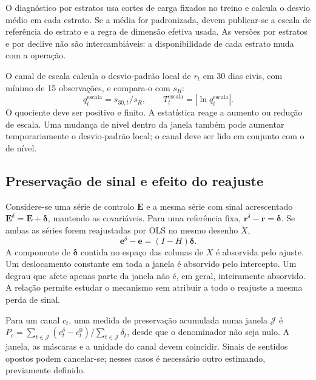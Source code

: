 O diagnóstico por estratos usa cortes de carga fixados no treino e calcula o desvio médio em cada estrato. Se a média for padronizada, devem publicar-se a escala de referência do estrato e a regra de dimensão efetiva usada. As versões por estratos e por declive não são intercambiáveis: a disponibilidade de cada estrato muda com a operação.

O canal de escala calcula o desvio-padrão local de $r_t$ em 30 dias civis, com mínimo de 15 observações, e compara-o com $s_R$:
\begin{equation}
q_t^{\mathrm{escala}}=s_{30,t}/s_R,
\qquad T_t^{\mathrm{escala}}=|\ln q_t^{\mathrm{escala}}|.
\label{eq:mat-monitor-escala}
\end{equation}
O quociente deve ser positivo e finito. A estatística reage a aumento ou redução de escala. Uma mudança de nível dentro da janela também pode aumentar temporariamente o desvio-padrão local; o canal deve ser lido em conjunto com o de nível.

\subsection{Preservação de sinal e efeito do reajuste}
\label{sec:mat-preservacao}
Considere-se uma série de controlo $\boldsymbol E$ e a mesma série com sinal acrescentado $\boldsymbol E^\delta=\boldsymbol E+\boldsymbol\delta$, mantendo as covariáveis. Para uma referência fixa, $\boldsymbol r^\delta-\boldsymbol r=\boldsymbol\delta$. Se ambas as séries forem reajustadas por OLS no mesmo desenho $X$,
\begin{equation}
\boldsymbol e^\delta-\boldsymbol e=(I-H)\boldsymbol\delta.
\label{eq:mat-projecao-sinal}
\end{equation}
A componente de $\boldsymbol\delta$ contida no espaço das colunas de $X$ é absorvida pelo ajuste. Um deslocamento constante em toda a janela é absorvido pelo intercepto. Um degrau que afete apenas parte da janela não é, em geral, inteiramente absorvido. A relação permite estudar o mecanismo sem atribuir a todo o reajuste a mesma perda de sinal.

Para um canal $c_t$, uma medida de preservação acumulada numa janela $\mathcal J$ é $P_c=\sum_{t\in\mathcal J}(c_t^\delta-c_t^0)/\sum_{t\in\mathcal J}\delta_t$, desde que o denominador não seja nulo. A janela, as máscaras e a unidade do canal devem coincidir. Sinais de sentidos opostos podem cancelar-se; nesses casos é necessário outro estimando, previamente definido.

